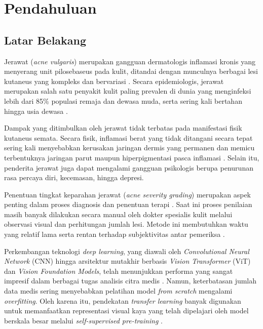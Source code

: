\chapter{Pendahuluan}

\section{Latar Belakang}

Jerawat (\textit{acne vulgaris}) merupakan gangguan dermatologis inflamasi kronis yang menyerang unit pilosebaseus pada kulit, ditandai dengan munculnya berbagai lesi kutaneus yang kompleks dan bervariasi \cite{jeong2023}. Secara epidemiologis, jerawat merupakan salah satu penyakit kulit paling prevalen di dunia yang menginfeksi lebih dari 85\% populasi remaja dan dewasa muda, serta sering kali bertahan hingga usia dewasa \cite{jeong2023}.

Dampak yang ditimbulkan oleh jerawat tidak terbatas pada manifestasi fisik kutaneus semata. Secara fisik, inflamasi berat yang tidak ditangani secara tepat sering kali menyebabkan kerusakan jaringan dermis yang permanen dan memicu terbentuknya jaringan parut maupun hiperpigmentasi pasca inflamasi \cite{jeong2023}. Selain itu, penderita jerawat juga dapat mengalami gangguan psikologis berupa penurunan rasa percaya diri, kecemasan, hingga depresi.

Penentuan tingkat keparahan jerawat (\textit{acne severity grading}) merupakan aspek penting dalam proses diagnosis dan penentuan terapi \cite{hayashi2008,lopez2023}. Saat ini proses penilaian masih banyak dilakukan secara manual oleh dokter spesialis kulit melalui observasi visual dan perhitungan jumlah lesi. Metode ini membutuhkan waktu yang relatif lama serta rentan terhadap subjektivitas antar pemeriksa \cite{lin2022}.

Perkembangan teknologi \textit{deep learning}, yang diawali oleh \textit{Convolutional Neural Network} (CNN) hingga arsitektur mutakhir berbasis \textit{Vision Transformer} (ViT) dan \textit{Vision Foundation Models}, telah menunjukkan performa yang sangat impresif dalam berbagai tugas analisis citra medis \cite{jeong2023,dosovitskiy2020image,simeoni2025dinov3}. Namun, keterbatasan jumlah data medis sering menyebabkan pelatihan model \textit{from scratch} mengalami \textit{overfitting}. Oleh karena itu, pendekatan \textit{transfer learning} banyak digunakan untuk memanfaatkan representasi visual kaya yang telah dipelajari oleh model berskala besar melalui \textit{self-supervised pre-training} \cite{jain2021,simeoni2025dinov3}.


